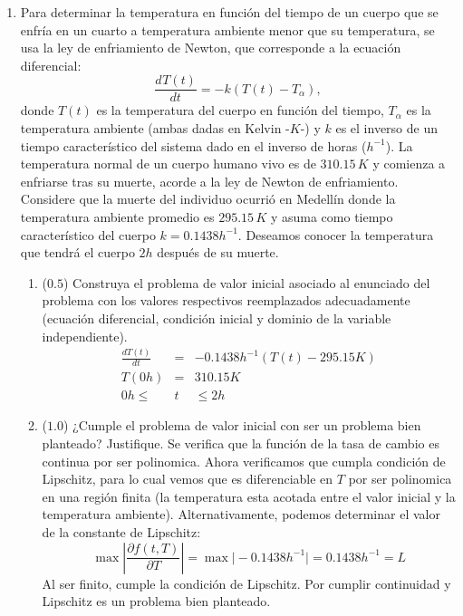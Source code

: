 \documentclass[12pt]{article}
\newcommand{\diff}[3]{\frac{d^{#3} #1}{d#2^{#3}}}
\begin{document}
\vspace{-.5cm}
  \begin{enumerate}[leftmargin=*,widest=9]
    \item Para determinar la temperatura en función del tiempo de un cuerpo que se enfría en un cuarto a temperatura ambiente menor que su temperatura, se usa la ley de enfriamiento de Newton, que corresponde a la ecuación diferencial:
    \[
    \diff{T(t)}{t}{} = -k(T(t) - T_{\alpha}),
    \]
    donde \(T(t)\) es la temperatura del cuerpo en función del tiempo, \(T_{\alpha}\) es la temperatura ambiente (ambas dadas en Kelvin -\(K\)-) y \(k\) es el inverso de un tiempo característico del sistema dado en el inverso de horas (\(h^{-1}\)).
    La temperatura normal de un cuerpo humano vivo es de \(310.15\,K\) y comienza a enfriarse tras su muerte, acorde a la ley de Newton de enfriamiento. Considere que la muerte del individuo ocurrió en Medellín donde la temperatura ambiente promedio es \(295.15\,K\) y asuma como tiempo característico del cuerpo \(k= 0.1438h^{-1}\). Deseamos conocer la temperatura que tendrá el cuerpo \(2h\) después de su muerte.
   \begin{enumerate}[label=\alph*]
    \item (\(0.5\)) Construya el problema de valor inicial asociado al enunciado del problema con los valores respectivos reemplazados adecuadamente (ecuación diferencial, condición inicial y dominio de la variable independiente).
    \begin{eqnarray*}
    \frac{dT(t)}{dt} &=& -0.1438 h^{-1} (T(t) - 295.15K)\\
    T(0h) &=& 310.15K \\
    0h \leq & t & \leq 2h
    \end{eqnarray*}
    \item (\(1.0\)) ¿Cumple el problema de valor inicial con ser un problema bien planteado? Justifique.
    Se verifica que la función de la tasa de cambio es continua por ser polinomica. Ahora verificamos que cumpla condición de Lipschitz, para lo cual vemos que es diferenciable en $T$ por ser polinomica en una región finita (la temperatura esta acotada entre el valor inicial y la temperatura ambiente). Alternativamente, podemos determinar el valor de la constante de Lipschitz:
    \begin{equation*}
    \max \left\vert \frac{\partial f(t, T)}{\partial T} \right\vert = \max \vert -0.1438h^{-1}\vert = 0.1438 h^{-1} = L
    \end{equation*}
    Al ser finito, cumple la condición de Lipschitz. Por cumplir continuidad y Lipschitz es un problema bien planteado.

\end{enumerate}
\end{enumerate}
\end{document}
